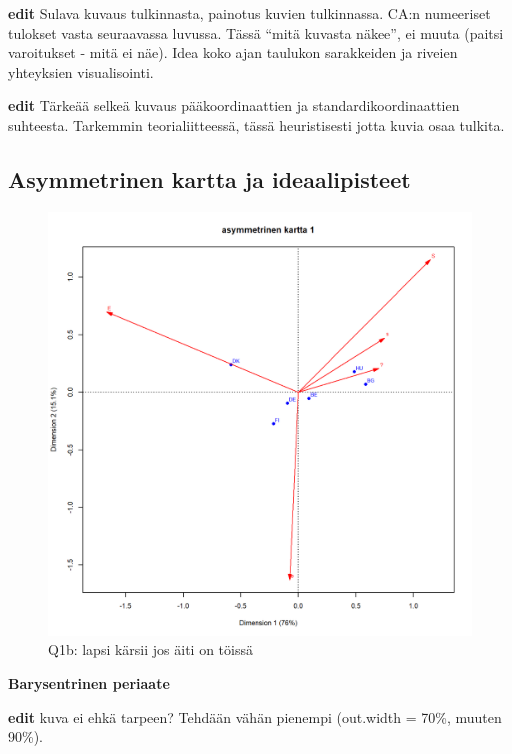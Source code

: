 \documentclass[
  finnish,
]{book}
\begin{document}
\textbf{edit} Sulava kuvaus tulkinnasta, painotus kuvien tulkinnassa. CA:n numeeriset
tulokset vasta seuraavassa luvussa. Tässä ``mitä kuvasta näkee'', ei muuta (paitsi
varoitukset - mitä ei näe). Idea koko ajan taulukon sarakkeiden ja riveien yhteyksien
visualisointi.

\textbf{edit} Tärkeää selkeä kuvaus pääkoordinaattien ja standardikoordinaattien
suhteesta. Tarkemmin teorialiitteessä, tässä heuristisesti jotta kuvia osaa tulkita.

\hypertarget{asymmetrinen-kartta-ja-ideaalipisteet}{%
\subsection{Asymmetrinen kartta ja ideaalipisteet}\label{asymmetrinen-kartta-ja-ideaalipisteet}}

\begin{figure}

{\centering \includegraphics[width=0.9\linewidth]{JH_capaper_files/figure-latex/G1-3asymm2-1} 

}

\caption{Q1b: lapsi kärsii jos äiti on töissä}\label{fig:G1-3asymm2}
\end{figure}

\textbf{Barysentrinen periaate}

\textbf{edit} kuva ei ehkä tarpeen? Tehdään vähän pienempi (out.width = 70\%, muuten 90\%).
\end{document}

